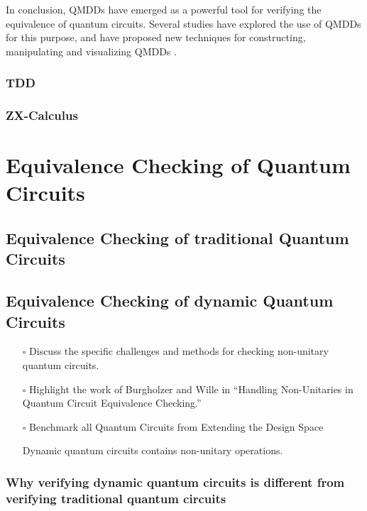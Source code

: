 \documentclass[11pt]{article}
\theoremstyle{definition}
\theoremstyle{definition}
\begin{document}
In conclusion, QMDDs have emerged as a powerful tool for verifying the
equivalence of quantum circuits. Several studies have explored the use of
QMDDs for this purpose, and have proposed new techniques for constructing,
manipulating and visualizing QMDDs \cite{Wille_tools_2022}. 

\subsubsection{TDD}
\label{sec:org90a6873}

\subsubsection{ZX-Calculus}
\label{sec:org9d653e5}

\section{Equivalence Checking of Quantum Circuits}
\label{sec:orgf9344d1}
\subsection{Equivalence Checking of traditional Quantum Circuits}
\label{sec:org23ea817}

\subsection{Equivalence Checking of dynamic Quantum Circuits}
\label{sec:org0631a3c}
\begin{itemize}
\item[{$\square$}] Discuss the specific challenges and methods for checking non-unitary quantum circuits.
\item[{$\square$}] Highlight the work of Burgholzer and Wille in ``Handling Non-Unitaries in Quantum Circuit Equivalence Checking.'' \cite{burgholzerHandlingNonunitariesQuantum2022}
\item[{$\square$}] Benchmark all Quantum Circuits from Extending the Design Space \cite{koleExtendingDesignSpace2023}

Dynamic quantum circuits contains non-unitary operations.
\end{itemize}

\subsubsection{Why verifying dynamic quantum circuits is different from verifying traditional quantum circuits}
\label{sec:org770c3c1}
\end{document}
